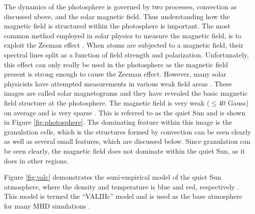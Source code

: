     The dynamics of the photosphere is governed by two processes, convection as discussed above, and the solar magnetic field.
    Thus understanding how the magnetic field is structured within the photosphere is important. 
    The most common method employed in solar physics to measure the magnetic field, is to exploit the Zeeman effect \citep{phillips1995guide}.
    When atoms are subjected to a magnetic field, their spectral lines split as a function of field strength and polarization.
    Unfortunately, this effect can only really be used in the photosphere as the magnetic field present is strong enough to cause the Zeeman effect.
    However, many solar physicists have attempted measurements in various weak field areas \citep{1995ApJ...439..474M,1538-4357-613-2-L177,2008A&A...489L..57K}.
    These images are called solar magnetograms and they have revealed the basic magnetic field structure at the photosphere.
    The magnetic field is very weak ($\le 40$ Gauss) on average and is very sparse \citep{0004-637X-636-1-496,2011A&A...526A..60V}.
    This is referred to as the quiet Sun and is shown in Figure \ref{fig:photosphere}. 
    The dominating feature within this image is the granulation cells, which is the structures formed by convection can be seen clearly as well as several small features, which are discussed below. 
    Since granulation can be seen clearly, the magnetic field does not dominate within the quiet Sun, as it does in other regions.
    
    Figure \ref{fig:valc} demonstrates the semi-empirical model of the quiet Sun atmosphere, where the density and temperature is blue and red, respectively \citep{1981ApJS...45..635V}.
    This model is termed the ``VALIIIc'' model and is used as the base atmosphere for many MHD simulations \citep{Mumford2015,GFME13a,fedun1,fedun2,2011AnGeo..29..883S,Wedemeyer2012,Vigeesh2012,0004-637X-743-1-14}.
    
